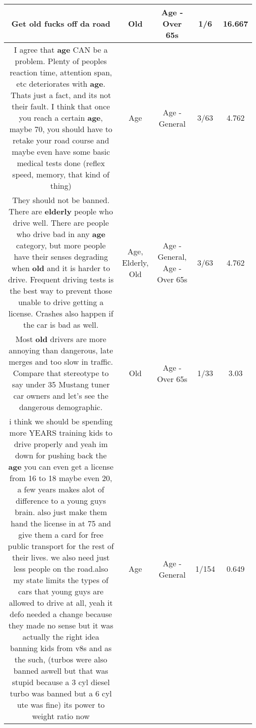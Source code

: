 \documentclass[11pt]{article}
\newlength\mylength
\begin{document}
\begin{center}
\begin{longtable}{|C{.65\mylength}|C{.30\mylength}|C{.12\mylength}|C{.12\mylength}|C{.12\mylength}|}
  \small Get \textbf{old} fucks off da road\normalsize   & Old & Age - Over 65s & 1/6 & 16.667 \\  \hline
  \small I agree that \textbf{age} CAN be a problem. Plenty of peoples reaction time, attention span, etc deteriorates with \textbf{age}. Thats just a fact, and its not their fault. I think that once you reach a certain \textbf{age}, maybe 70, you should have to retake your road course and maybe even have some basic medical tests done (reflex speed, memory, that kind of thing)\normalsize   & Age & Age - General & 3/63 & 4.762 \\  \hline
  \small They should not be banned. There are \textbf{elderly} people who drive well. There are people who drive bad in any \textbf{age} category, but more people have their senses degrading when \textbf{old} and it is harder to drive. Frequent driving tests is the best way to prevent those unable to drive getting a license. Crashes also happen if the car is bad as well.\normalsize   & Age, Elderly, Old & Age - General, Age - Over 65s & 3/63 & 4.762 \\  \hline
  \small Most \textbf{old} drivers are more annoying than dangerous, late merges and too slow in traffic.  Compare that stereotype to say under 35 Mustang  tuner car owners and let's see the dangerous demographic.\normalsize   & Old & Age - Over 65s & 1/33 & 3.03 \\  \hline
  \small i think we should be spending more YEARS training kids to drive properly and yeah im down for pushing back the \textbf{age} you can even get a license from 16 to 18 maybe even 20, a few years makes alot of difference to a young guys brain. also just make them hand the license in at 75 and give them a card for free public transport for the rest of their lives. we also need just less people on the road.also my state limits the types of cars that young guys are allowed to drive at all, yeah it defo needed a change because they made no sense but it was actually the right idea banning kids from v8s and as the such, (turbos were also banned aswell but that was stupid because a 3 cyl diesel turbo was banned but a 6 cyl ute was fine) its power to weight ratio now\normalsize   & Age & Age - General & 1/154 & 0.649 \\  \hline

\end{longtable}
\end{center}
\end{document}

